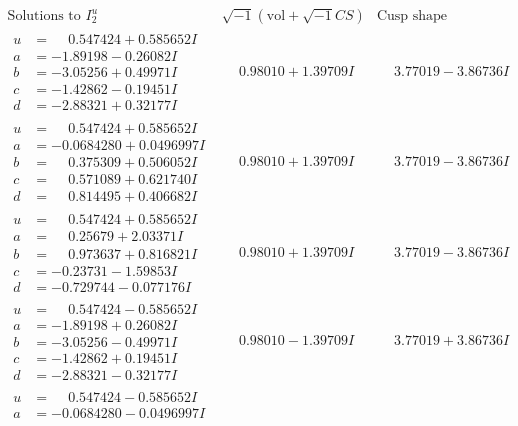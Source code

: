\documentclass[1p]{elsarticle_modified}
\theoremstyle{definition}
\newcommand{\I}{\sqrt{-1}}
\begin{document}
$$\begin{array}{c|c|c}  
\text{Solutions to }I^u_{2}& \I (\text{vol} + \sqrt{-1}CS) & \text{Cusp shape}\\
 \hline 
\begin{aligned}
u &= \phantom{-}0.547424 + 0.585652 I \\
a &= -1.89198 - 0.26082 I \\
b &= -3.05256 + 0.49971 I \\
c &= -1.42862 - 0.19451 I \\
d &= -2.88321 + 0.32177 I\end{aligned}
 & \phantom{-}0.98010 + 1.39709 I & \phantom{-}3.77019 - 3.86736 I \\ \hline\begin{aligned}
u &= \phantom{-}0.547424 + 0.585652 I \\
a &= -0.0684280 + 0.0496997 I \\
b &= \phantom{-}0.375309 + 0.506052 I \\
c &= \phantom{-}0.571089 + 0.621740 I \\
d &= \phantom{-}0.814495 + 0.406682 I\end{aligned}
 & \phantom{-}0.98010 + 1.39709 I & \phantom{-}3.77019 - 3.86736 I \\ \hline\begin{aligned}
u &= \phantom{-}0.547424 + 0.585652 I \\
a &= \phantom{-}0.25679 + 2.03371 I \\
b &= \phantom{-}0.973637 + 0.816821 I \\
c &= -0.23731 - 1.59853 I \\
d &= -0.729744 - 0.077176 I\end{aligned}
 & \phantom{-}0.98010 + 1.39709 I & \phantom{-}3.77019 - 3.86736 I \\ \hline\begin{aligned}
u &= \phantom{-}0.547424 - 0.585652 I \\
a &= -1.89198 + 0.26082 I \\
b &= -3.05256 - 0.49971 I \\
c &= -1.42862 + 0.19451 I \\
d &= -2.88321 - 0.32177 I\end{aligned}
 & \phantom{-}0.98010 - 1.39709 I & \phantom{-}3.77019 + 3.86736 I \\ \hline\begin{aligned}
u &= \phantom{-}0.547424 - 0.585652 I \\
a &= -0.0684280 - 0.0496997 I \\

\end{aligned}
\end{array}$$
\end{document}
